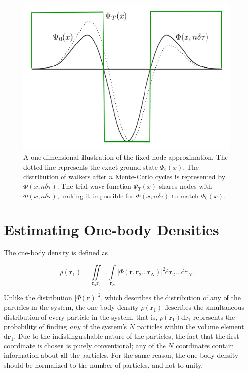 \begin{figure}
 \begin{center}
  \includegraphics[scale=0.3]{../Graphics/fixxednode.pdf}
  \caption{A one-dimensional illustration of the fixed node approximation. The dotted line represents the exact ground state $\Psi_0(x)$. The distribution of walkers after $n$ Monte-Carlo cycles is represented by $\Phi(x, n\delta\tau)$. The trial wave function $\Psi_T(x)$ shares nodes with $\Phi(x, n\delta\tau)$, making it impossible for $\Phi(x, n\delta\tau)$ to match $\Psi_0(x)$.}
  \label{fig:fixxednode}
 \end{center}
\end{figure}


\section{Estimating One-body Densities}
\label{sec:OBD}

The one-body density is defined as

\begin{equation}
 \rho(  \mathbf{r}_1) = \iint\limits_{  \mathbf{r}_2   \mathbf{r}_3}...\int\limits_{  \mathbf{r}_N} \left|\Phi(  \mathbf{r}_1   \mathbf{r}_2 ...   \mathbf{r}_N)\right|^2\mathrm{d}  \mathbf{r}_2...\mathrm{d}  \mathbf{r}_N.
\end{equation}

Unlike the distribution $|\Phi(\mathbf{r})|^2$, which describes the distribution of any of the particles in the system, the one-body density $\rho(\mathbf{r}_1)$ describes the simultaneous distribution of every particle in the system, that is, $\rho(\mathbf{r}_1)\mathrm{d}\mathbf{r}_1$ represents the probability of finding \textit{any} of the system's $N$ particles within the volume element $\mathrm{d}\mathbf{r}_1$. Due to the indistinguishable nature of the particles, the fact that the first coordinate is chosen is purely conventional; any of the $N$ coordinates contain information about all the particles. For the same reason, the one-body density should be normalized to the number of particles, and not to unity.   

